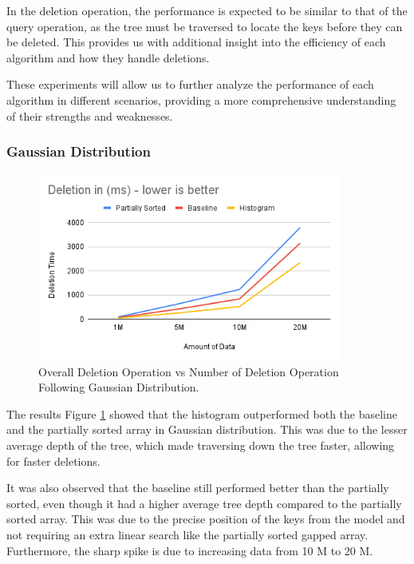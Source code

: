 In the deletion operation, the performance is expected to be similar to that of the query operation, as the tree must be traversed to locate the keys before they can be deleted. This provides us with additional insight into the efficiency of each algorithm and how they handle deletions.

These experiments will allow us to further analyze the performance of each algorithm in different scenarios, providing a more comprehensive understanding of their strengths and weaknesses.

\subsubsection{Gaussian Distribution}
\begin{figure}[H]
    \centering
    \includegraphics[width=100mm,scale=1]{Figures/DeleteGaussian.png}
    \caption{
Overall Deletion Operation vs Number of Deletion Operation Following Gaussian     Distribution.    }
    \label{fig:DeleteGaussian}
\end{figure}
The results Figure \ref{fig:DeleteGaussian} showed that the histogram outperformed both the baseline and the partially sorted array in Gaussian distribution. This was due to the lesser average depth of the tree, which made traversing down the tree faster, allowing for faster deletions.

It was also observed that the baseline still performed better than the partially sorted, even though it had a higher average tree depth compared to the partially sorted array. This was due to the precise position of the keys from the model and not requiring an extra linear search like the partially sorted gapped array. Furthermore, the sharp spike is due to increasing data from 10 M to 20 M.


